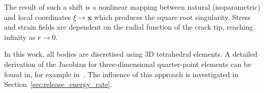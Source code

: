 \documentclass[twocolumn]{svjour3}
\begin{document}
The result of such a shift is a nonlinear mapping between natural (isoparametric) and local coordinates $\xi \rightarrow \mathbf x$ which produces the square root singularity. Stress and strain fields are dependent on the radial function of the crack tip, reaching infinity as $ r \rightarrow 0$. 

In this work, all bodies are discretised using 3D tetrahedral elements. A detailed derivation of the Jacobian for three-dimensional quarter-point elements can be found in, for example in~\citep{nejati2015use}. 
The influence of this approach is investigated in Section~\ref{sec:release_energy_rate}.

\end{document}
